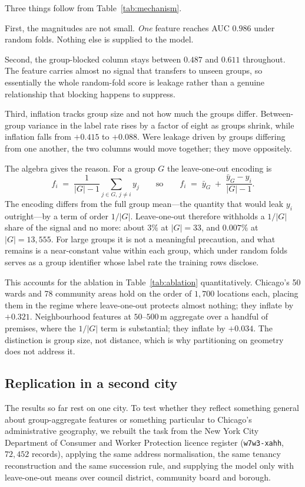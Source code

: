 \documentclass[11pt]{article}
\begin{document}
Three things follow from Table~\ref{tab:mechanism}.

First, the magnitudes are not small. \emph{One} feature reaches AUC $0.986$
under random folds. Nothing else is supplied to the model.

Second, the group-blocked column stays between $0.487$ and $0.611$ throughout.
The feature carries almost no signal that transfers to unseen groups, so
essentially the whole random-fold score is leakage rather than a genuine
relationship that blocking happens to suppress.

Third, inflation tracks group size and not how much the groups differ.
Between-group variance in the label rate rises by a factor of eight as groups
shrink, while inflation falls from $+0.415$ to $+0.088$. Were leakage driven by
groups differing from one another, the two columns would move together; they
move oppositely.

The algebra gives the reason. For a group $G$ the leave-one-out encoding is
\[
f_i \;=\; \frac{1}{|G|-1}\sum_{j \in G,\, j \neq i} y_j
\qquad\text{so}\qquad
f_i \;=\; \bar{y}_G \;+\; \frac{\bar{y}_G - y_i}{|G|-1}.
\]
The encoding differs from the full group mean---the quantity that would leak
$y_i$ outright---by a term of order $1/|G|$. Leave-one-out therefore withholds a
$1/|G|$ share of the signal and no more: about $3\%$ at $|G|=33$, and $0.007\%$
at $|G|=13{,}555$. For large groups it is not a meaningful precaution, and what
remains is a near-constant value within each group, which under random folds
serves as a group identifier whose label rate the training rows disclose.

This accounts for the ablation in Table~\ref{tab:ablation} quantitatively.
Chicago's 50 wards and 78 community areas hold on the order of $1{,}700$
locations each, placing them in the regime where leave-one-out protects almost
nothing; they inflate by $+0.321$. Neighbourhood features at $50$--$500$\,m
aggregate over a handful of premises, where the $1/|G|$ term is substantial;
they inflate by $+0.034$. The distinction is group size, not distance, which is
why partitioning on geometry does not address it.

\subsection{Replication in a second city}

The results so far rest on one city. To test whether they reflect something
general about group-aggregate features or something particular to Chicago's
administrative geography, we rebuilt the task from the New York City Department
of Consumer and Worker Protection licence register (\texttt{w7w3-xahh},
$72{,}452$ records), applying the same address normalisation, the same tenancy
reconstruction and the same succession rule, and supplying the model only with
leave-one-out means over council district, community board and borough.
\end{document}
